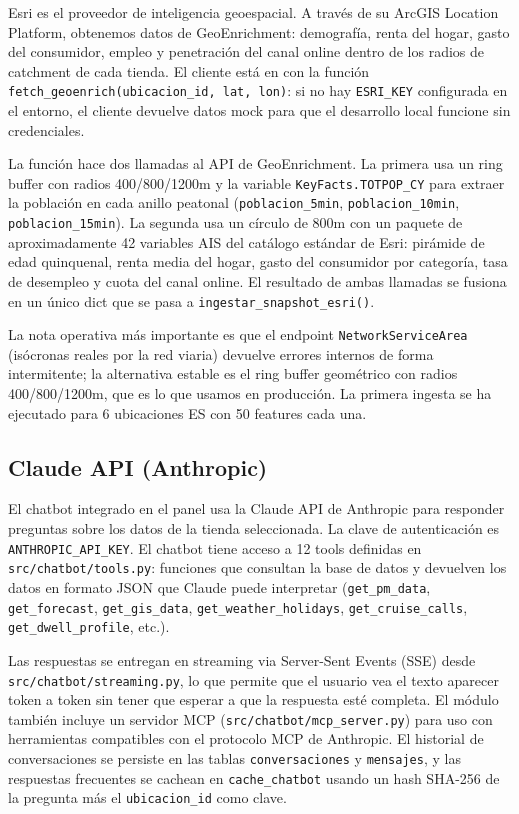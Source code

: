 \documentclass[12pt, a4paper]{article}
\begin{document}
Esri es el proveedor de inteligencia geoespacial. A través de su ArcGIS Location Platform, obtenemos datos de GeoEnrichment: demografía, renta del hogar, gasto del consumidor, empleo y penetración del canal online dentro de los radios de catchment de cada tienda. El cliente está en  con la función \texttt{fetch\_geoenrich(ubicacion\_id, lat, lon)}: si no hay \texttt{ESRI\_KEY} configurada en el entorno, el cliente devuelve datos mock para que el desarrollo local funcione sin credenciales.

La función hace dos llamadas al API de GeoEnrichment. La primera usa un ring buffer con radios 400/800/1200m y la variable \texttt{KeyFacts.TOTPOP\_CY} para extraer la población en cada anillo peatonal (\texttt{poblacion\_5min}, \texttt{poblacion\_10min}, \texttt{poblacion\_15min}). La segunda usa un círculo de 800m con un paquete de aproximadamente 42 variables AIS del catálogo estándar de Esri: pirámide de edad quinquenal, renta media del hogar, gasto del consumidor por categoría, tasa de desempleo y cuota del canal online. El resultado de ambas llamadas se fusiona en un único dict que se pasa a \texttt{ingestar\_snapshot\_esri()}.

La nota operativa más importante es que el endpoint \texttt{NetworkServiceArea} (isócronas reales por la red viaria) devuelve errores internos de forma intermitente; la alternativa estable es el ring buffer geométrico con radios 400/800/1200m, que es lo que usamos en producción. La primera ingesta se ha ejecutado para 6 ubicaciones ES con 50 features cada una.

\subsection{Claude API (Anthropic)}

El chatbot integrado en el panel usa la Claude API de Anthropic para responder preguntas sobre los datos de la tienda seleccionada. La clave de autenticación es \texttt{ANTHROPIC\_API\_KEY}. El chatbot tiene acceso a 12 tools definidas en \texttt{src/chatbot/tools.py}: funciones que consultan la base de datos y devuelven los datos en formato JSON que Claude puede interpretar (\texttt{get\_pm\_data}, \texttt{get\_forecast}, \texttt{get\_gis\_data}, \texttt{get\_weather\_holidays}, \texttt{get\_cruise\_calls}, \texttt{get\_dwell\_profile}, etc.).

Las respuestas se entregan en streaming via Server-Sent Events (SSE) desde \texttt{src/chatbot/streaming.py}, lo que permite que el usuario vea el texto aparecer token a token sin tener que esperar a que la respuesta esté completa. El módulo también incluye un servidor MCP (\texttt{src/chatbot/mcp\_server.py}) para uso con herramientas compatibles con el protocolo MCP de Anthropic. El historial de conversaciones se persiste en las tablas \texttt{conversaciones} y \texttt{mensajes}, y las respuestas frecuentes se cachean en \texttt{cache\_chatbot} usando un hash SHA-256 de la pregunta más el \texttt{ubicacion\_id} como clave.
\end{document}
